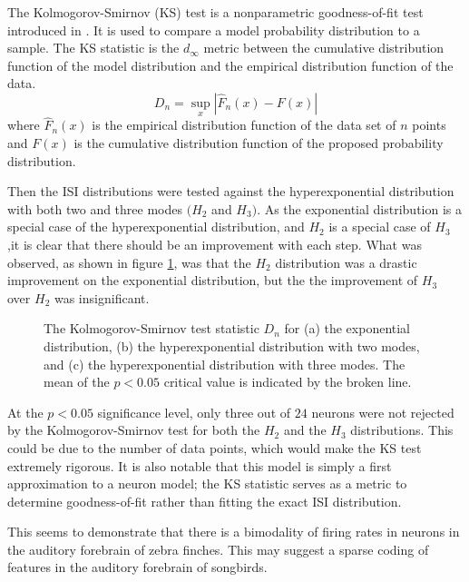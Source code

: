 The Kolmogorov-Smirnov (KS) test is a nonparametric goodness-of-fit test introduced in \cite{Massey1951a}.  It is used to compare a model probability distribution to a sample.  The KS statistic is the $d_{\infty}$ metric between the cumulative distribution function of the model distribution and the empirical distribution function of the data.
\begin{equation}
D_n = \sup_x \left| \hat{F}_n(x) - F(x) \right|
\end{equation}
where $\hat{F}_n(x)$ is the empirical distribution function of the data set of $n$ points and $F(x)$ is the cumulative distribution function of the proposed probability distribution.

Then the ISI distributions were tested against the hyperexponential distribution with both two and three modes $(H_2$ and $H_3)$.  As the exponential distribution is a special case of the hyperexponential distribution, and $H_2$ is a special case of $H_3$ ,it is clear that there should be an improvement with each step.  What was observed, as shown in figure \ref{exphehe3}, was that the $H_2$ distribution was a drastic improvement on the exponential distribution, but the the improvement of $H_3$ over $H_2$ was insignificant. 

\begin{figure}

\caption{\label{exphehe3} The Kolmogorov-Smirnov test statistic $D_n$ for (a) the exponential distribution, (b) the hyperexponential distribution with two modes, and (c) the hyperexponential distribution with three modes.  The mean of the $p<0.05$ critical value is indicated by the broken line.}
\end{figure}

At the $p<0.05$ significance level, only three out of $24$ neurons were not rejected by the Kolmogorov-Smirnov test for both the $H_2$ and the $H_3$ distributions. This could be due to the number of data points, which would make the KS test extremely rigorous.  It is also notable that this model is simply a first approximation to a neuron model; the KS statistic serves as a metric to determine goodness-of-fit rather than fitting the exact ISI distribution.

This seems to demonstrate that there is a bimodality of firing rates in neurons in the auditory forebrain of zebra finches.  This may suggest a sparse coding of features in the auditory forebrain of songbirds.  


